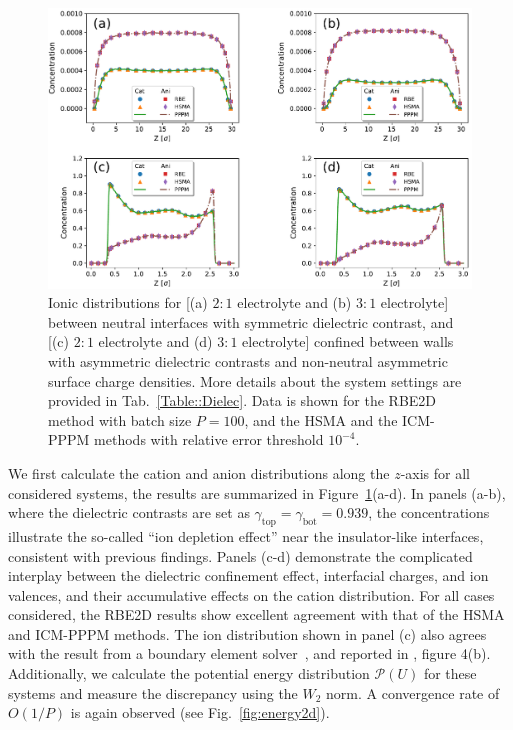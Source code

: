 \begin{figure}[ht!]
\centering
	\includegraphics[width=0.95\linewidth]{figs/DistributionDie.pdf}
	\caption{Ionic distributions for [(a) $2:1$ electrolyte and (b) $3:1$ electrolyte] between neutral interfaces with symmetric dielectric contrast, and [(c) $2:1$ electrolyte and (d) $3:1$ electrolyte] confined between walls with asymmetric dielectric contrasts and non-neutral asymmetric surface charge densities. More details about the system settings are provided in Tab.~\ref{Table::Dielec}. 
    Data   {is} shown for the RBE2D method with batch size $P=100$, and the HSMA and the ICM-PPPM methods with relative error threshold $10^{-4}$.} 
	\label{fig:den1}
\end{figure}

We first calculate the cation and anion distributions along  {the} $z$-axis for all considered systems, the results are summarized in Figure~\ref{fig:den1}(a-d). 
In panels (a-b), where the dielectric contrasts are set as $\gamma_{\text{top}}=\gamma_{\text{bot}}=0.939$, the concentrations illustrate the so-called ``ion depletion effect'' near the insulator-like interfaces, consistent with previous findings. 
Panels (c-d) demonstrate the complicated interplay between the dielectric confinement effect, interfacial charges, and ion valences, and their accumulative effects on the cation distribution. %
For all cases considered, the RBE2D results show excellent agreement with that of the HSMA and ICM-PPPM methods. 
The ion distribution shown in panel (c) also agrees with the result from a boundary element solver~\cite{wu2018asymmetric}, and reported in \cite{yuan2021particle}, figure 4(b). 
Additionally, we calculate the potential energy distribution $\mathscr{P}(U)$ for these systems and measure the discrepancy using the $W_2$ norm.
A convergence rate of $O(1/P)$ is again observed (see Fig.~\ref{fig:energy2d}).

